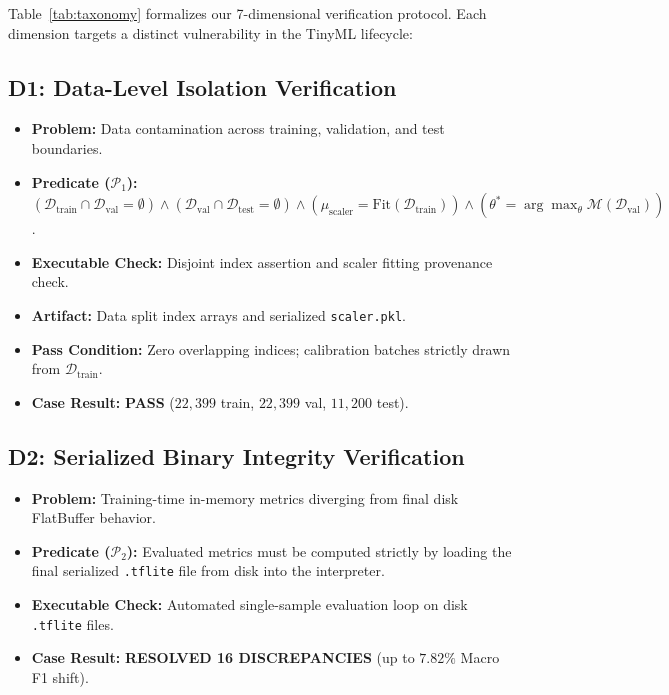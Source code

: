 \documentclass[journal]{IEEEtran}
\begin{document}
Table~\ref{tab:taxonomy} formalizes our 7-dimensional verification protocol. Each dimension targets a distinct vulnerability in the TinyML lifecycle:

\subsection{D1: Data-Level Isolation Verification}
\begin{itemize}
    \item \textbf{Problem:} Data contamination across training, validation, and test boundaries.
    \item \textbf{Predicate ($\mathcal{P}_1$):} $(\mathcal{D}_{\text{train}} \cap \mathcal{D}_{\text{val}} = \emptyset) \land (\mathcal{D}_{\text{val}} \cap \mathcal{D}_{\text{test}} = \emptyset) \land (\mu_{\text{scaler}} = \text{Fit}(\mathcal{D}_{\text{train}})) \land (\theta^* = \arg\max_{\theta} \mathcal{M}(\mathcal{D}_{\text{val}}))$.
    \item \textbf{Executable Check:} Disjoint index assertion and scaler fitting provenance check.
    \item \textbf{Artifact:} Data split index arrays and serialized \texttt{scaler.pkl}.
    \item \textbf{Pass Condition:} Zero overlapping indices; calibration batches strictly drawn from $\mathcal{D}_{\text{train}}$.
    \item \textbf{Case Result:} \textbf{PASS} ($22,399$ train, $22,399$ val, $11,200$ test).
\end{itemize}

\subsection{D2: Serialized Binary Integrity Verification}
\begin{itemize}
    \item \textbf{Problem:} Training-time in-memory metrics diverging from final disk FlatBuffer behavior.
    \item \textbf{Predicate ($\mathcal{P}_2$):} Evaluated metrics must be computed strictly by loading the final serialized \texttt{.tflite} file from disk into the interpreter.
    \item \textbf{Executable Check:} Automated single-sample evaluation loop on disk \texttt{.tflite} files.
    \item \textbf{Case Result:} \textbf{RESOLVED 16 DISCREPANCIES} (up to $7.82\%$ Macro F1 shift).
\end{itemize}
\end{document}
